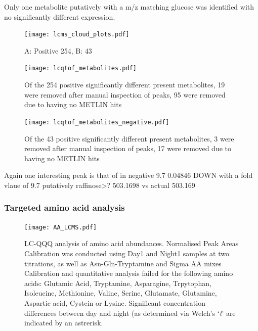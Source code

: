 Only one metabolite putatively with a m/z matching glucose 
was identified with no significantly different expression.



\begin{figure}
    \texttt{[image: lcms\_cloud\_plots.pdf]}
    \caption[LCQTOF Cloud Plots]{A: Positive 254,  B: 43}
    \label{fig:lcms_clouds}
\end{figure}


\begin{figure}
    \texttt{[image: lcqtof\_metabolites.pdf]}
    \caption{Of the 254 positive significantly different present metabolites,
        19 were removed after manual inspection of peaks, 95 were removed due
    to having no METLIN hits}
    \label{fig:poslcqtof}
\end{figure}

\begin{figure}
    \texttt{[image: lcqtof\_metabolites\_negative.pdf]}
    \caption{Of the 43 positive significantly different present metabolites,
        3 were removed after manual inspection of peaks, 17 were removed due
    to having no METLIN hits}
    \label{fig:poslcqtof}
\end{figure}




Again one interesting peak is that of 
in negative
9.7 0.04846 DOWN with a fold vlaue of 9.7
putatively raffinose>? 503.1698  vs actual 503.169
    

\subsubsection{Targeted amino acid analysis}



\begin{figure}
    \texttt{[image: AA\_LCMS.pdf]}
    \caption[LCQQQ Quantitative Analysis of Amino Acids]{LC-QQQ analysis
        of amino acid abundances. Normalised Peak Areas 
        Calibration was conducted using Day1 and Night1 samples at two titrations, as well as Asn-Gln-Tryptamine and Sigma AA mixes
    Calibration and quantitative analysis failed for the following amino acids: 
Glutamic Acid, Tryptamine, Asparagine, Trpytophan, Isoleucine, Methionine, Valine, Serine, Glutamate, Glutamine, Aspartic acid, Cystein or Lysine.
Significant concentration differences between day and night (as determined via Welch's `\textit{t}' are indicated by an astrerisk.}
    \label{fig:amino_acids}
\end{figure}









